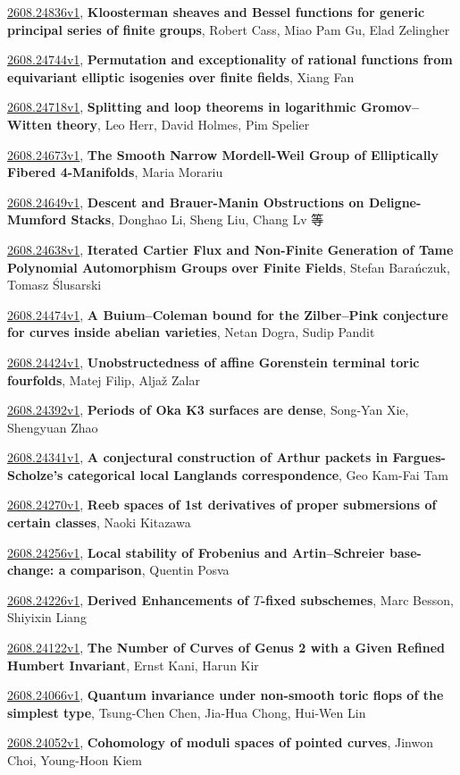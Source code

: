 \documentclass[9pt, a4paper]{article}
\theoremstyle{plain}
\theoremstyle{definition}
\theoremstyle{remark}
\newcommand{\arxiv}[3]{\href{https://arxiv.org/abs/#1}{#1}, \textbf{\textcolor{arxivblue}{#2}}, #3}
\begin{document}
\arxiv{2608.24836v1}{Kloosterman sheaves and Bessel functions for generic principal series of finite groups}{Robert Cass, Miao Pam Gu, Elad Zelingher}

\arxiv{2608.24744v1}{Permutation and exceptionality of rational functions from equivariant elliptic isogenies over finite fields}{Xiang Fan}

\arxiv{2608.24718v1}{Splitting and loop theorems in logarithmic Gromov--Witten theory}{Leo Herr, David Holmes, Pim Spelier}

\arxiv{2608.24673v1}{The Smooth Narrow Mordell-Weil Group of Elliptically Fibered 4-Manifolds}{Maria Morariu}

\arxiv{2608.24649v1}{Descent and Brauer-Manin Obstructions on Deligne-Mumford Stacks}{Donghao Li, Sheng Liu, Chang Lv 等}

\arxiv{2608.24638v1}{Iterated Cartier Flux and Non-Finite Generation of Tame Polynomial Automorphism Groups over Finite Fields}{Stefan Barańczuk, Tomasz Ślusarski}

\arxiv{2608.24474v1}{A Buium--Coleman bound for the Zilber--Pink conjecture for curves inside abelian varieties}{Netan Dogra, Sudip Pandit}

\arxiv{2608.24424v1}{Unobstructedness of affine Gorenstein terminal toric fourfolds}{Matej Filip, Aljaž Zalar}

\arxiv{2608.24392v1}{Periods of Oka K3 surfaces are dense}{Song-Yan Xie, Shengyuan Zhao}

\arxiv{2608.24341v1}{A conjectural construction of Arthur packets in Fargues-Scholze's categorical local Langlands correspondence}{Geo Kam-Fai Tam}

\arxiv{2608.24270v1}{Reeb spaces of 1st derivatives of proper submersions of certain classes}{Naoki Kitazawa}

\arxiv{2608.24256v1}{Local stability of Frobenius and Artin--Schreier base-change: a comparison}{Quentin Posva}

\arxiv{2608.24226v1}{Derived Enhancements of $T$-fixed subschemes}{Marc Besson, Shiyixin Liang}

\arxiv{2608.24122v1}{The Number of Curves of Genus 2 with a Given Refined Humbert Invariant}{Ernst Kani, Harun Kir}

\arxiv{2608.24066v1}{Quantum invariance under non-smooth toric flops of the simplest type}{Tsung-Chen Chen, Jia-Hua Chong, Hui-Wen Lin}

\arxiv{2608.24052v1}{Cohomology of moduli spaces of pointed curves}{Jinwon Choi, Young-Hoon Kiem}
\end{document}
